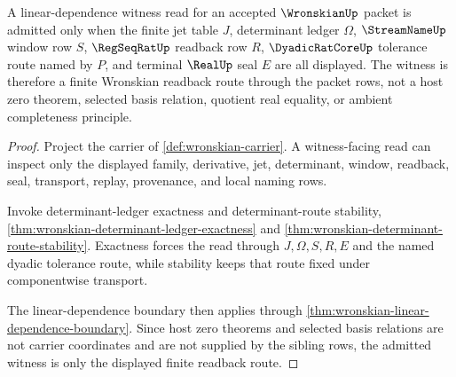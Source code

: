 \begin{theorem}
\label{thm:wronskian-linear-dependence-witness}
A linear-dependence witness read for an accepted $\WronskianUp$ packet is admitted only when the finite jet table $J$, determinant ledger $\Omega$, $\StreamNameUp$ window row $S$, $\RegSeqRatUp$ readback row $R$, $\DyadicRatCoreUp$ tolerance route named by $P$, and terminal $\RealUp$ seal $E$ are all displayed. The witness is therefore a finite Wronskian readback route through the packet rows, not a host zero theorem, selected basis relation, quotient real equality, or ambient completeness principle.
\end{theorem}
\begin{proof}
Project the carrier of \autoref{def:wronskian-carrier}. A witness-facing read can inspect only the displayed family, derivative, jet, determinant, window, readback, seal, transport, replay, provenance, and local naming rows.

Invoke determinant-ledger exactness and determinant-route stability, \autoref{thm:wronskian-determinant-ledger-exactness} and \autoref{thm:wronskian-determinant-route-stability}. Exactness forces the read through $J,\Omega,S,R,E$ and the named dyadic tolerance route, while stability keeps that route fixed under componentwise transport.

The linear-dependence boundary then applies through \autoref{thm:wronskian-linear-dependence-boundary}. Since host zero theorems and selected basis relations are not carrier coordinates and are not supplied by the sibling rows, the admitted witness is only the displayed finite readback route.
\end{proof}

